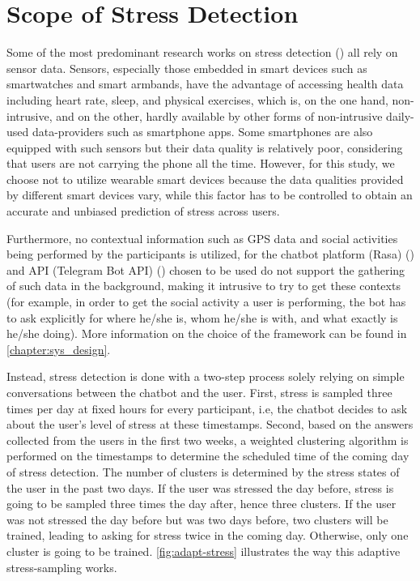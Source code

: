 \section{Scope of Stress Detection}
Some of the most predominant research works on stress detection (\cite{7_stress_detection, 8_stress_detection, 9_stress_detection}) all rely on sensor data. Sensors, especially those embedded in smart devices such as smartwatches and smart armbands, have the advantage of accessing health data including heart rate, sleep, and physical exercises, which is, on the one hand, non-intrusive, and on the other, hardly available by other forms of non-intrusive daily-used data-providers such as smartphone apps. Some smartphones are also equipped with such sensors but their data quality is relatively poor, considering that users are not carrying the phone all the time. However, for this study, we choose not to utilize wearable smart devices because the data qualities provided by different smart devices vary, while this factor has to be controlled to obtain an accurate and unbiased prediction of stress across users.

Furthermore, no contextual information such as GPS data and social activities being performed by the participants is utilized, for the chatbot platform (Rasa) (\cite{10_rasa}) and API (Telegram Bot API) (\cite{11_tg_bot_api}) chosen to be used do not support the gathering of such data in the background, making it intrusive to try to get these contexts (for example, in order to get the social activity a user is performing, the bot has to ask explicitly for where he/she is, whom he/she is with, and what exactly is he/she doing). More information on the choice of the framework can be found in \autoref{chapter:sys_design}. \bigskip

Instead, stress detection is done with a two-step process solely relying on simple conversations between the chatbot and the user. First, stress is sampled three times per day at fixed hours for every participant, i.e, the chatbot decides to ask about the user’s level of stress at these timestamps. Second, based on the answers collected from the users in the first two weeks, a weighted clustering algorithm is performed on the timestamps to determine the scheduled time of the coming day of stress detection. The number of clusters is determined by the stress states of the user in the past two days. If the user was stressed the day before, stress is going to be sampled three times the day after, hence three clusters. If the user was not stressed the day before but was two days before, two clusters will be trained, leading to asking for stress twice in the coming day. Otherwise, only one cluster is going to be trained. \autoref{fig:adapt-stress} illustrates the way this adaptive stress-sampling works.

